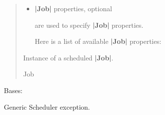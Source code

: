 \documentclass[letterpaper,10pt,english]{sphinxmanual}
\begin{document}
\begin{fulllineitems}
\begin{fulllineitems}
\begin{quote}
\begin{description}
\begin{itemize}
\item {} 
\sphinxAtStartPar
{} \textendash{} 
\sphinxAtStartPar
{\color{red}\bfseries{}|Job|} properties, optional

\sphinxAtStartPar
{} are used to specify {\color{red}\bfseries{}|Job|} properties.

\sphinxAtStartPar
Here is a list of available {\color{red}\bfseries{}|Job|} properties:


\end{itemize}

\sphinxAtStartPar
Instance of a scheduled {\color{red}\bfseries{}|Job|}.

\sphinxAtStartPar
Job

\end{description}\end{quote}

\end{fulllineitems}


\end{fulllineitems}


\begin{fulllineitems}
\label{\detokenize{index:scheduler.SchedulerError}}
\pysigstartsignatures
\pysigline
{}
\pysigstopsignatures
\sphinxAtStartPar
Bases: 

\sphinxAtStartPar
Generic Scheduler exception.

\end{fulllineitems}



\renewcommand{\indexname}{Python Module Index}
\begin{sphinxtheindex}
\let\bigletter\sphinxstyleindexlettergroup
\bigletter{c}
\item\relax{}
\indexspace
\bigletter{s}
\item\relax{}
\end{sphinxtheindex}

\renewcommand{\indexname}{Index}
\printindex
\end{document}
